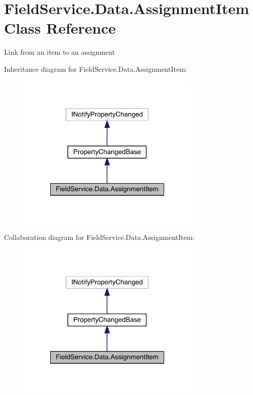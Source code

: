 \hypertarget{class_field_service_1_1_data_1_1_assignment_item}{\section{Field\+Service.\+Data.\+Assignment\+Item Class Reference}
\label{class_field_service_1_1_data_1_1_assignment_item}
}


Link from an item to an assignment  




Inheritance diagram for Field\+Service.\+Data.\+Assignment\+Item\+:
\nopagebreak
\begin{figure}[H]
\begin{center}
\leavevmode
\includegraphics[width=248pt]{class_field_service_1_1_data_1_1_assignment_item__inherit__graph}
\end{center}
\end{figure}


Collaboration diagram for Field\+Service.\+Data.\+Assignment\+Item\+:
\nopagebreak
\begin{figure}[H]
\begin{center}
\leavevmode
\includegraphics[width=248pt]{class_field_service_1_1_data_1_1_assignment_item__coll__graph}
\end{center}
\end{figure}

